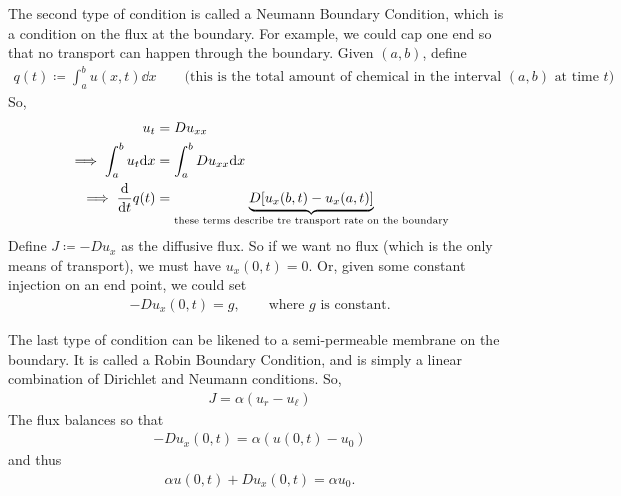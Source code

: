\documentclass{article}
\begin{document}
            The second type of condition is called a Neumann Boundary Condition, which is a condition on the flux at the boundary.  For example, we could cap one end so that no transport can happen through the boundary.  Given $(a,b)$, define
            \begin{align*}
                q(t) \coloneqq \int_a^b u(x,t)\dd x \qquad \text{(this is the total amount of chemical in the interval $(a,b)$ at time $t$)}
            \end{align*}
            So,
            \begin{align*}
                u_t &= D u_{xx} \\
                \implies \int_a^b u_t \dd x &= \int_a^b D u_{xx} \dd x \\
                \implies \frac{\dd}{\dd t} q(t) &= \underbrace{D\qty[u_x(b,t) - u_x(a,t)]}_{\text{these terms describe tre transport rate on the boundary}}
            \end{align*}
            Define $J \coloneqq -Du_x$ as the diffusive flux.  So if we want no flux (which is the only means of transport), we must have $u_x(0,t) = 0$.  Or, given some constant injection on an end point, we could set
            \begin{align*}
                -D u_x(0,t) = g, \qquad \text{where $g$ is constant.}
            \end{align*}

            The last type of condition can be likened to a semi-permeable membrane on the boundary.  It is called a Robin Boundary Condition, and is simply a linear combination of Dirichlet and Neumann conditions.  So,
            \begin{align*}
                J = \alpha(u_r - u_\ell)
            \end{align*}
            The flux balances so that
            \begin{align*}
                -D u_x(0,t) = \alpha(u(0,t) - u_0)
            \end{align*}
            and thus
            \begin{align*}
                \alpha u(0,t) + D u_x(0,t) = \alpha u_0.
            \end{align*}
\end{document}
